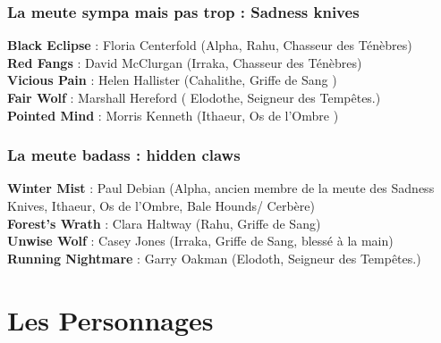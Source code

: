\documentclass[oneside,12pt]{book}
\newcommand{\BlackEclipse}{\textbf{Black Eclipse} }
\begin{document}
\begin{flushleft}
\subsection{La meute sympa mais pas trop : Sadness knives}
\label{sadnessknives}
\textbf{\BlackEclipse} : Floria Centerfold (Alpha, Rahu, Chasseur des Ténèbres)\\
\textbf{Red Fangs} : David McClurgan  (Irraka, Chasseur des Ténèbres)\\
\textbf{Vicious Pain} : Helen Hallister (Cahalithe, Griffe de Sang )\\
\textbf{Fair Wolf} :   Marshall Hereford ( Elodothe, Seigneur des Tempêtes.)\\
\textbf{Pointed Mind} : Morris Kenneth (Ithaeur, Os de l'Ombre )\\

\subsection{La meute badass : hidden claws}
\label{hiddenclaws}
\textbf{Winter Mist} : Paul Debian (Alpha, ancien membre de la meute des Sadness Knives, Ithaeur, Os de l'Ombre, Bale Hounds/ Cerbère)\\
\textbf{Forest’s Wrath} : Clara Haltway (Rahu, Griffe de Sang) \\
\textbf{Unwise Wolf} : Casey Jones (Irraka, Griffe de Sang, blessé à la main)\\
\textbf{Running Nightmare} : Garry Oakman (Elodoth, Seigneur des Tempêtes.) \\

\chapter{Les Personnages}
\clearpage

\end{flushleft}
\end{document}
